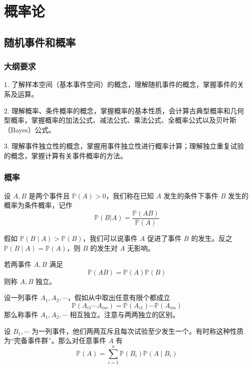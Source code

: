 \chapter{概率论}

\newcommand{\bbP}{\mathbb{P}}
\newcommand{\bbE}{\mathbb{E}}
\newcommand{\bbD}{\mathbb{D}}

\section{随机事件和概率}

\subsection{大纲要求}

1. 了解样本空间（基本事件空间）的概念，理解随机事件的概念，掌握事件的关系及运算。

2. 理解概率、条件概率的概念，掌握概率的基本性质，会计算古典型概率和几何型概率，掌握概率的加法公式、减法公式、乘法公式、全概率公式以及贝叶斯（Bayes）公式。

3. 理解事件独立性的概念，掌握用事件独立性进行概率计算；理解独立重复试验的概念，掌握计算有关事件概率的方法。

\subsection{概率}

\begin{definition}
	设 $A,B$ 是两个事件且 $\bbP(A) > 0$，我们称在已知 $A$ 发生的条件下事件 $B$ 发生的概率为条件概率，记作
	\[ \bbP(B | A) = \frac{\bbP(AB)}{\bbP(A)} \]
\end{definition}

假如 $\bbP(B \mid A) > \bbP(B)$，我们可以说事件 $A$ 促进了事件 $B$ 的发生。反之 $\bbP(B \mid A) = \bbP(A)$，则 $B$ 的发生对 $A$ 无影响。

若两事件 $A, B$ 满足
\[ \bbP(A B) = \bbP(A) \bbP(B) \]
则称 $A, B$ 独立。

设一列事件 $A_1, A_2, \cdots$，假如从中取出任意有限个都成立
\[ \bbP(A_{i1} \cdots A_{im}) = \bbP(A_{i1}) \cdots \bbP(A_{im}) \]
那么称事件 $A_1, A_2, \cdots$ 相互独立。注意与两两独立的区别。


\begin{theorem}[全概率公式]
	设 $B_1, \cdots$ 为一列事件，他们两两互斥且每次试验至少发生一个。有时称这种性质为“完备事件群”。那么对任意事件 $A$ 有
	\[ \bbP(A) = \sum_{i=1}^n \bbP(B_i)\bbP(A \mid B_i) \]
\end{theorem}

